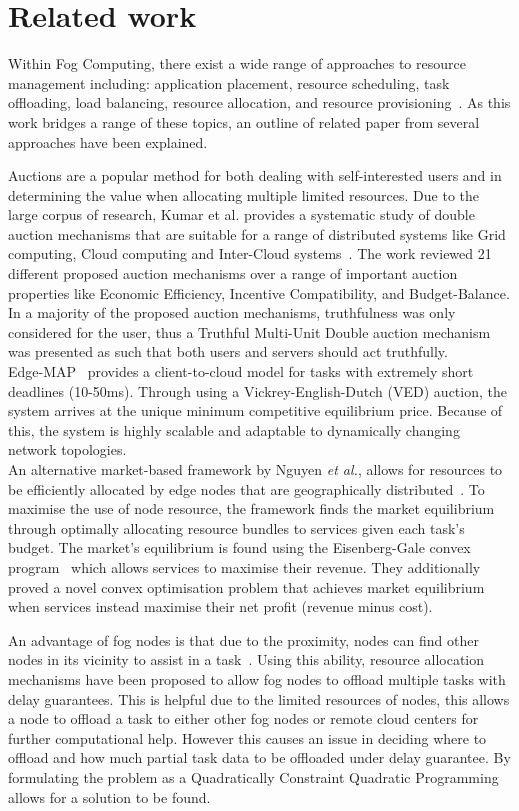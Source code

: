 \section{Related work}
\label{sec:related-work}
Within Fog Computing, there exist a wide range of approaches to resource management including:
application placement, resource scheduling, task offloading, load balancing, resource allocation,
and resource provisioning~\cite{ghobaei2019resource}. As this work bridges a range of these topics, an outline of
related paper from several approaches have been explained.

Auctions are a popular method for both dealing with self-interested users and in determining the value when allocating
multiple limited resources. Due to the large corpus of research, Kumar et al. provides a systematic study of double
auction mechanisms that are suitable for a range of distributed systems like Grid computing, Cloud computing and Inter-Cloud
systems~\cite{KUMAR2017234}. The work reviewed 21 different proposed auction mechanisms over a range of important auction
properties like Economic Efficiency, Incentive Compatibility, and Budget-Balance. In a majority of the proposed auction
mechanisms, truthfulness was only considered for the user, thus a Truthful Multi-Unit Double auction mechanism was
presented as such that both users and servers should act truthfully. \\
Edge-MAP~\cite{tasiopoulos2018edge} provides a client-to-cloud model for tasks with extremely short deadlines
(10-50ms). Through using a Vickrey-English-Dutch (VED) auction, the system arrives at the unique minimum competitive
equilibrium price. Because of this, the system is highly scalable and adaptable to dynamically changing network
topologies. \\
An alternative market-based framework by Nguyen \emph{et al.}, allows for resources to be efficiently allocated by edge nodes
that are geographically distributed~\cite{8373684}. To maximise the use of node resource, the framework finds the market
equilibrium through optimally allocating resource bundles to services given each task's budget. The market's
equilibrium is found using the Eisenberg-Gale convex program~\cite{JAIN201084} which allows services to maximise their revenue. They
additionally proved a novel convex optimisation problem that achieves market equilibrium when services instead maximise
their net profit (revenue minus cost).

An advantage of fog nodes is that due to the proximity, nodes can find other nodes in its vicinity to assist in a
task~\cite{8839780}. Using this ability, resource allocation mechanisms have been proposed to allow fog nodes to offload
multiple tasks with delay guarantees. This is helpful due to the limited resources of nodes, this allows a node to
offload a task to either other fog nodes or remote cloud centers for further computational help. However this causes an
issue in deciding where to offload and how much partial task data to be offloaded under delay guarantee. By formulating
the problem as a Quadratically Constraint Quadratic Programming allows for a solution to be found.

